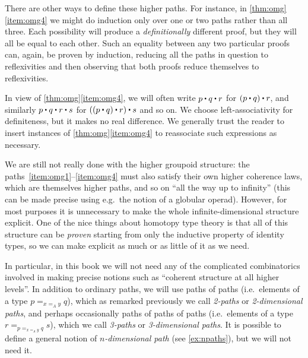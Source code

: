 \begin{rmk}
  There are other ways to define these higher paths.
  For instance, in \autoref{thm:omg}\ref{item:omg4} we might do induction only over one or two paths rather than all three.
  Each possibility will produce a \emph{definitionally} different proof, but they will all be equal to each other.
  Such an equality between any two particular proofs can, again, be proven by induction, reducing all the paths in question to reflexivities and then observing that both proofs reduce themselves to reflexivities.
\end{rmk}

In view of \autoref{thm:omg}\ref{item:omg4}, we will often write $p\ct q\ct r$ for $(p\ct q)\ct r$, and similarly $p\ct q\ct r \ct s$ for $((p\ct q)\ct r)\ct s$ and so on.
We choose left-associativity for definiteness, but it makes no real difference.
We generally trust the reader to insert instances of \autoref{thm:omg}\ref{item:omg4} to reassociate such expressions as necessary.

We are still not really done with the higher groupoid structure: the paths~\ref{item:omg1}--\ref{item:omg4} must also satisfy their own higher coherence laws, which are themselves higher paths,
%
%
%
%
and so on ``all the way up to infinity'' (this can be made precise using e.g.\ the notion of a globular operad).
However, for most purposes it is unnecessary to make the whole infinite-dimensional structure explicit.
One of the nice things about homotopy type theory is that all of this structure can be \emph{proven} starting from only the inductive property of identity types, so we can make explicit as much or as little of it as we need.

In particular, in this book we will not need any of the complicated combinatorics involved in making precise notions such as ``coherent structure at all higher levels''.
In addition to ordinary paths, we will use paths of paths (i.e.\ elements of a type $p =_{x=_A y} q$), which as remarked previously we call \emph{2-paths} or \emph{2-dimensional paths}, and perhaps occasionally paths of paths of paths (i.e.\ elements of a type $r = _{p =_{x=_A y} q} s$), which we call \emph{3-paths} or \emph{3-dimensional paths}.
It is possible to define a general notion of \emph{$n$-dimensional path}
%
%
%
%
(see \autoref{ex:npaths}), but we will not need it.

